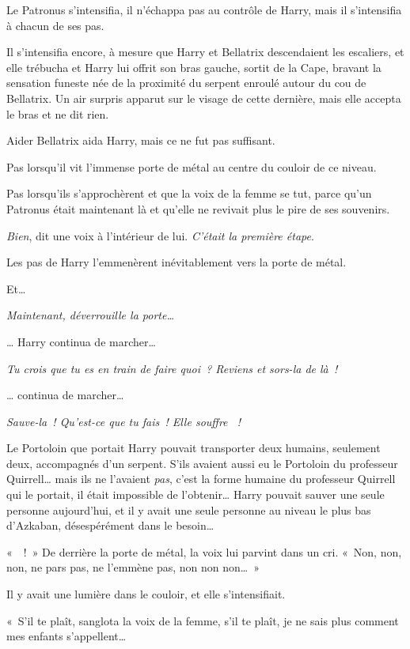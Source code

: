 Le Patronus s'intensifia, il n'échappa pas au contrôle de Harry, mais il s'intensifia à chacun de ses pas.

Il s'intensifia encore, à mesure que Harry et Bellatrix descendaient les escaliers, et elle trébucha et Harry lui offrit son bras gauche, sortit de la Cape, bravant la sensation funeste née de la proximité du serpent enroulé autour du cou de Bellatrix.
Un air surpris apparut sur le visage de cette dernière, mais elle accepta le bras et ne dit rien.

Aider Bellatrix aida Harry, mais ce ne fut pas suffisant.

Pas lorsqu'il vit l'immense porte de métal au centre du couloir de ce niveau.

Pas lorsqu'ils s'approchèrent et que la voix de la femme se tut, parce qu'un Patronus était maintenant là et qu'elle ne revivait plus le pire de ses souvenirs.

\emph{Bien}, dit une voix à l'intérieur de lui.
\emph{C'était la première étape}.

Les pas de Harry l'emmenèrent inévitablement vers la porte de métal.

Et…

\emph{Maintenant, déverrouille la porte…}

… Harry continua de marcher…

\emph{Tu crois que tu es en train de faire quoi~?
Reviens et sors-la de là~!}

… continua de marcher…

\emph{Sauve-la~!
Qu'est-ce que tu fais~!
Elle souffre ~!}

Le Portoloin que portait Harry pouvait transporter deux humains, seulement deux, accompagnés d'un serpent.
S'ils avaient aussi eu le Portoloin du professeur Quirrell… mais ils ne l'avaient \emph{pas}, c'est la forme humaine du professeur Quirrell qui le portait, il était impossible de l'obtenir…
Harry pouvait sauver une seule personne aujourd'hui, et il y avait une seule personne au niveau le plus bas d'Azkaban, désespérément dans le besoin…

«~~!~»
De derrière la porte de métal, la voix lui parvint dans un cri.
«~Non, non, non, ne pars pas, ne l'emmène pas, non non non…~»

Il y avait une lumière dans le couloir, et elle s'intensifiait.

«~S'il te plaît, sanglota la voix de la femme, s'il te plaît, je ne sais plus comment mes enfants s'appellent…

